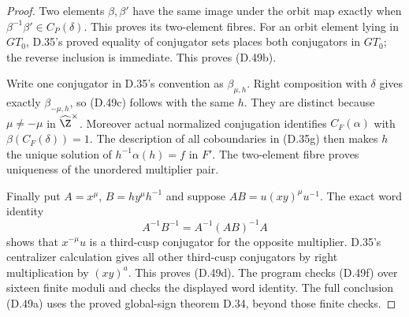 \begin{proof}
Two elements $\beta,\beta'$ have the same image
under the orbit map exactly when
$\beta^{-1}\beta'\in C_P(\delta)$.
This proves its two-element fibres.
For an orbit element lying in $GT_0$, D.35's
proved equality of conjugator sets places both
conjugators in $GT_0$; the reverse inclusion is
immediate.  This proves (D.49b).

Write one conjugator in D.35's convention as
$\beta_{\mu,h}$.  Right composition with $\delta$
gives exactly $\beta_{-\mu,h}$, so (D.49c) follows
with the same $h$.
They are distinct because $\mu\ne-\mu$ in
$\widehat\Z^\times$.
Moreover actual normalized conjugation identifies
$C_F(\alpha)$ with $\beta(C_F(\delta))=1$.
The description of all coboundaries in (D.35g)
then makes $h$ the unique solution of
$h^{-1}\alpha(h)=f$ in $F'$.
The two-element fibre proves uniqueness of the
unordered multiplier pair.

Finally put $A=x^\mu$, $B=h y^\mu h^{-1}$ and
suppose $AB=u(xy)^\mu u^{-1}$.
The exact word identity
\[
           A^{-1}B^{-1}=A^{-1}(AB)^{-1}A
\]
shows that $x^{-\mu}u$ is a third-cusp conjugator
for the opposite multiplier.
D.35's centralizer calculation gives all other
third-cusp conjugators by right multiplication
by $(xy)^a$.  This proves (D.49d).
The program
checks (D.49f) over sixteen finite moduli and
checks the displayed word identity.
The full conclusion (D.49a) uses the proved
global-sign theorem D.34, beyond those finite
checks.
\end{proof}
